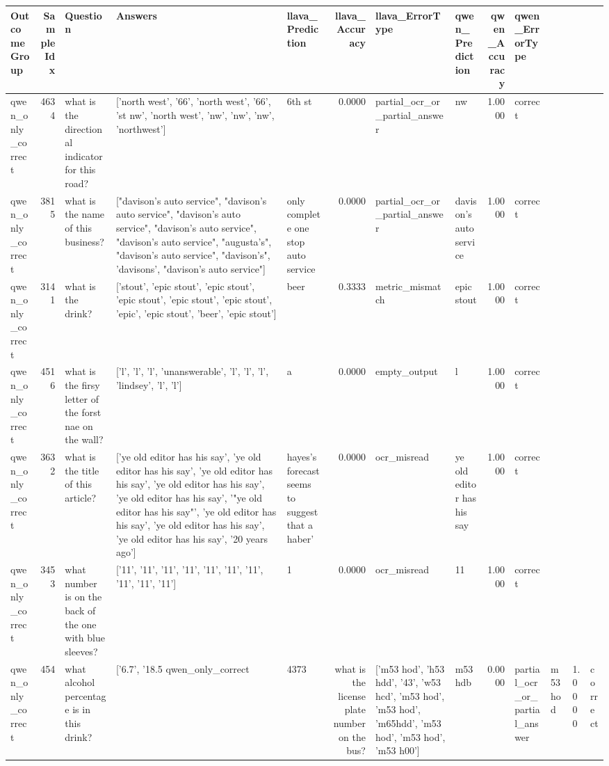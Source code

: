 \begin{tabular}{lrlllrllrl}
\toprule
OutcomeGroup & SampleIdx & Question & Answers & llava\_Prediction & llava\_Accuracy & llava\_ErrorType & qwen\_Prediction & qwen\_Accuracy & qwen\_ErrorType \\
\midrule
qwen\_only\_correct & 4634 & what is the directional indicator for this road? & ['north west', '66', 'north west', '66', 'st nw', 'north west', 'nw', 'nw', 'nw', 'northwest'] & 6th st & 0.0000 & partial\_ocr\_or\_partial\_answer & nw & 1.0000 & correct \\
qwen\_only\_correct & 3815 & what is the name of this business? & ["davison's auto service", "davison's auto service", "davison's auto service", "davison's auto service", "davison's auto service", "augusta's", "davison's auto service", "davison's", 'davisons', "davison's auto service"] & only complete one stop auto service & 0.0000 & partial\_ocr\_or\_partial\_answer & davison's auto service & 1.0000 & correct \\
qwen\_only\_correct & 3141 & what is the drink? & ['stout', 'epic stout', 'epic stout', 'epic stout', 'epic stout', 'epic stout', 'epic', 'epic stout', 'beer', 'epic stout'] & beer & 0.3333 & metric\_mismatch & epic stout & 1.0000 & correct \\
qwen\_only\_correct & 4516 & what is the firsy letter of the forst nae on the wall? & ['l', 'l', 'l', 'unanswerable', 'l', 'l', 'l', 'lindsey', 'l', 'l'] & a & 0.0000 & empty\_output & l & 1.0000 & correct \\
qwen\_only\_correct & 3632 & what is the title of this article? & ['ye old editor has his say', 'ye old editor has his say', 'ye old editor has his say', 'ye old editor has his say', 'ye old editor has his say', '"ye old editor has his say"', 'ye old editor has his say', 'ye old editor has his say', 'ye old editor has his say', '20 years ago'] & hayes's forecast seems to suggest that a haber' & 0.0000 & ocr\_misread & ye old editor has his say & 1.0000 & correct \\
qwen\_only\_correct & 3453 & what number is on the back of the one with blue sleeves? & ['11', '11', '11', '11', '11', '11', '11', '11', '11', '11'] & 1 & 0.0000 & ocr\_misread & 11 & 1.0000 & correct \\
qwen\_only\_correct & 454 & what alcohol percentage is in this drink? & ['6.7', '18.5%
qwen\_only\_correct & 4373 & what is the license plate number on the bus? & ['m53 hod', 'h53 hdd', '43', 'w53 hcd', 'm53 hod', 'm53 hod', 'm65hdd', 'm53 hod', 'm53 hod', 'm53 h00'] & m53 hdb & 0.0000 & partial\_ocr\_or\_partial\_answer & m53 hod & 1.0000 & correct \\

\end{tabular}
